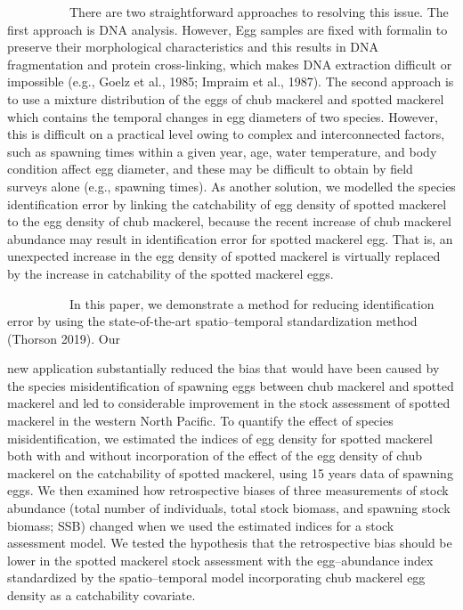 \documentclass[12pt]{article}
\begin{document}
\begin{linenumbers}
\ \ \ \ \ \ \ \ \ \ 
There are two straightforward approaches to resolving this issue. The first approach is DNA analysis. However, Egg samples are fixed with formalin to preserve their morphological characteristics and this results in DNA fragmentation and protein cross-linking, which makes DNA extraction difficult or impossible (e.g., Goelz et al., 1985; Impraim et al., 1987). The second approach is to use a mixture distribution of the eggs of chub mackerel and spotted mackerel which contains the temporal changes in egg diameters of two species. However, this is difficult on a practical level owing to complex and interconnected factors, such as spawning times within a given year, age, water temperature, and body condition affect egg diameter, and these may be difficult to obtain by field surveys alone (e.g., spawning times). As another solution, we modelled the species identification error by linking the catchability of egg density of spotted mackerel to the egg density of chub mackerel, because the recent increase of chub mackerel abundance may result in identification error for spotted mackerel egg. That is, an unexpected increase in the egg density of spotted mackerel is virtually replaced by the increase in catchability of the spotted mackerel eggs.

\ \ \ \ \ \ \ \ \ \ 
In this paper, we demonstrate a method for reducing identification error by using the state-of-the-art spatio--temporal standardization method (Thorson 2019). Our {new application substantially reduced the bias that would have been caused by the species misidentification of spawning eggs between chub mackerel and spotted mackerel and led to considerable improvement in the stock assessment of spotted mackerel in the western North Pacific. To quantify the effect of species misidentification, we estimated the indices of egg density for spotted mackerel both with and without incorporation of the effect of the egg density of chub mackerel on the catchability of spotted mackerel, using 15 years data of spawning eggs. We then examined how retrospective biases of three measurements of stock abundance (total number of individuals, total stock biomass, and spawning stock biomass; SSB) changed when we used the estimated indices for a stock assessment model. We tested the hypothesis that the retrospective bias should be lower in the spotted mackerel stock assessment with the egg--abundance index standardized by the spatio--temporal model incorporating chub mackerel egg density as a catchability covariate.

\ \\

}
\end{linenumbers}
\end{document}
